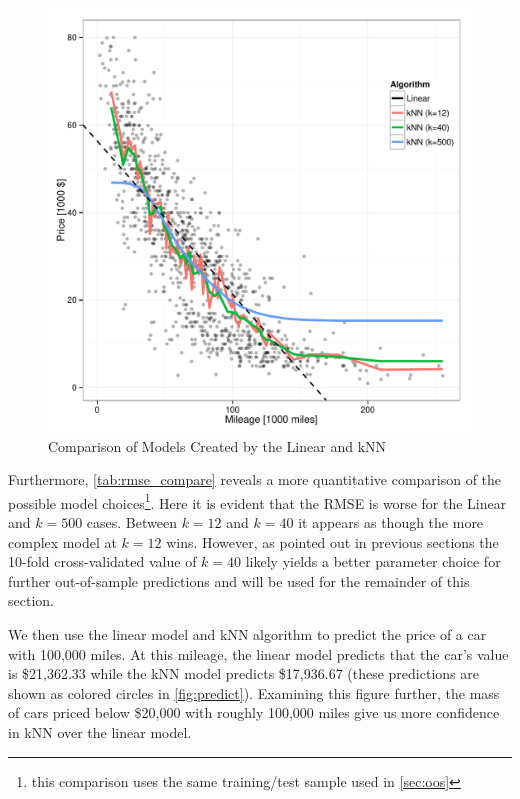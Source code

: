 \documentclass[11pt, fleqn]{article}
\begin{document}
\begin{figure}[!htb]
  \centering
  \includegraphics[scale=.5]{pred_models.pdf}
  \caption{Comparison of Models Created by the Linear and kNN}
  \label{fig:models}
\end{figure}

Furthermore, \cref{tab:rmse_compare} reveals a more quantitative comparison of the possible model choices\footnote{this comparison uses the same training/test sample used in \cref{sec:oos}}.  Here it is evident that the RMSE is worse for the Linear and $k=500$ cases.  Between $k=12$ and $k=40$ it appears as though the more complex model  at $k=12$ wins.  However, as pointed out in previous sections the 10-fold cross-validated value of $k=40$ likely yields a better parameter choice for further out-of-sample predictions and will be used for the remainder of this section.



We then use the linear model and kNN algorithm to predict the price of a car with 100,000 miles.  At this mileage, the linear model predicts that the car's value is \$21,362.33 while the kNN model predicts \$17,936.67 (these predictions are shown as colored circles in \cref{fig:predict}).  Examining this figure further, the mass of cars priced below \$20,000 with roughly 100,000 miles give us more confidence in kNN over the linear model.
\end{document}
